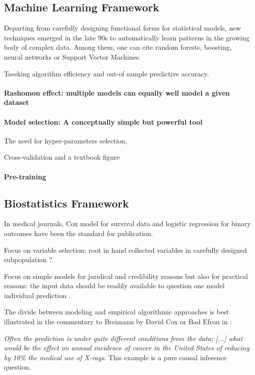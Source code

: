 \documentclass{report}
\begin{document}
\begin{background_box_left}

  \subsection{Machine Learning Framework}\label{subsec:intro:machine_learning}

  Departing from carefully designing functional forms for statistical models,
  new techniques emerged in the late 90s to automatically learn patterns in the
  growing body of complex data. Among them, one can cite random forests,
  boosting, neural networks or Support Vector Machines.


  Tseeking algorithm efficiency and out-of sample predictive accuracy.


  \paragraph{Rashomon effect: multiple models can equally well model a given dataset}

  \paragraph{Model selection: A conceptually simple but powerful tool}

  The need for hyper-parameters selection,

  Cross-validation \citep{stone1974cross} and a textbook figure

  \paragraph{Pre-training}


  \subsection{Biostatistics Framework}\label{subsec:intro:biostatistics_framework}

  In medical journals, Cox model for survival data and logistic regression for
  binary outcomes have been the standard for publication.

  Focus on variable selection: root in hand collected variables in carefully
  designed subpopulation ?

  Focus on simple models for juridical and credibility reasons but also for
  practical reasons: the input data should be readily available to question one
  model individual prediction \citep{wyatt1995commentary}.

  The divide between modeling and empirical algorithmic approaches is best
  illustrated in the commentary to Breimann by David Cox or Bad Efron in  \cite{}:

  \textit{Often the prediction is under quite different conditions from the
  data; [...] what would be the effect on annual incidence of cancer in the
  United States of reducing by 10\% the medical use of X-rays}. This example is
  a pure causal inference question.

\end{background_box_left}
\end{document}

